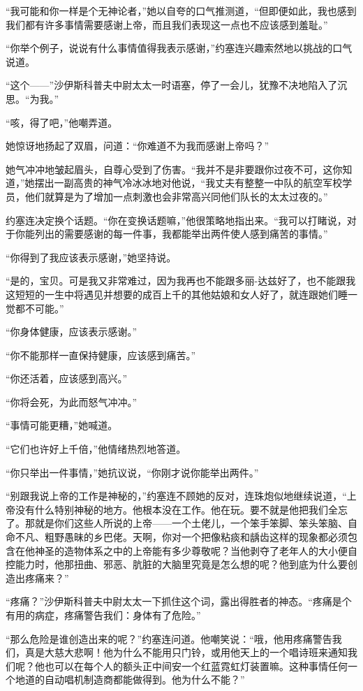     “我可能和你一样是个无神论者，”她以自夸的口气推测道，“但即便如此，我也感到我们都有许多事情需要感谢上帝，而且我们表现这一点也不应该感到羞耻。”

    “你举个例子，说说有什么事情值得我表示感谢，”约塞连兴趣索然地以挑战的口气说道。

    “这个——”沙伊斯科普夫中尉太太一时语塞，停了一会儿，犹豫不决地陷入了沉思。“为我。”

    “咳，得了吧，”他嘲弄道。

    她惊讶地扬起了双眉，问道：“你难道不为我而感谢上帝吗？”

    她气冲冲地皱起眉头，自尊心受到了伤害。“我并不是非要跟你过夜不可，这你知道，”她摆出一副高贵的神气冷冰冰地对他说，“我丈夫有整整一中队的航空军校学员，他们就算是为了增加一点刺激也会非常高兴同他们队长的太太过夜的。”

    约塞连决定换个话题。“你在变换话题嘛，”他很策略地指出来。“我可以打睹说，对于你能列出的需要感谢的每一件事，我都能举出两件使人感到痛苦的事情。”

    “你得到了我应该表示感谢，”她坚持说。

    “是的，宝贝。可是我又非常难过，因为我再也不能跟多丽-达兹好了，也不能跟我这短短的一生中将遇见并想要的成百上千的其他姑娘和女人好了，就连跟她们睡一觉都不可能。”

    “你身体健康，应该表示感谢。”

    “你不能那样一直保持健康，应该感到痛苦。”

    “你还活着，应该感到高兴。”

    “你将会死，为此而怒气冲冲。”

    “事情可能更糟，”她喊道。

    “它们也许好上千倍，”他情绪热烈地答道。

    “你只举出一件事情，”她抗议说，“你刚才说你能举出两件。”

    “别跟我说上帝的工作是神秘的，”约塞连不顾她的反对，连珠炮似地继续说道，“上帝没有什么特别神秘的地方。他根本没在工作。他在玩。要不就是他把我们全忘了。那就是你们这些人所说的上帝——一个土佬儿，一个笨手笨脚、笨头笨脑、自命不凡、粗野愚昧的乡巴佬。天啊，你对一个把像粘痰和龋齿这样的现象都必须包含在他神圣的造物体系之中的上帝能有多少尊敬呢？当他剥夺了老年人的大小便自控能力时，他那扭曲、邪恶、肮脏的大脑里究竟是怎么想的呢？他到底为什么要创造出疼痛来？”

    “疼痛？”沙伊斯科普夫中尉太太一下抓住这个词，露出得胜者的神态。“疼痛是个有用的病症，疼痛警告我们：身体有了危险。”
 


    “那么危险是谁创造出来的呢？”约塞连问道。他嘲笑说：“哦，他用疼痛警告我们，真是大慈大悲啊！他为什么不能用只门铃，或用他天上的一个唱诗班来通知我们呢？他也可以在每个人的额头正中间安一个红蓝霓虹灯装置嘛。这种事情任何一个地道的自动唱机制造商都能做得到。他为什么不能？”

